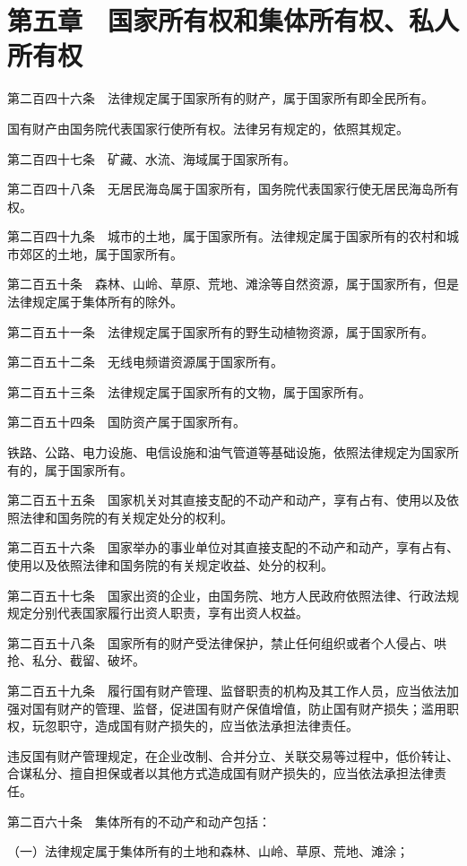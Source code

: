 \documentclass[UTF8,12pt,a4paper]{ctexbook}
\begin{document}
\section*{第五章　国家所有权和集体所有权、私人所有权}

第二百四十六条　法律规定属于国家所有的财产，属于国家所有即全民所有。

国有财产由国务院代表国家行使所有权。法律另有规定的，依照其规定。

第二百四十七条　矿藏、水流、海域属于国家所有。

第二百四十八条　无居民海岛属于国家所有，国务院代表国家行使无居民海岛所有权。

第二百四十九条　城市的土地，属于国家所有。法律规定属于国家所有的农村和城市郊区的土地，属于国家所有。

第二百五十条　森林、山岭、草原、荒地、滩涂等自然资源，属于国家所有，但是法律规定属于集体所有的除外。

第二百五十一条　法律规定属于国家所有的野生动植物资源，属于国家所有。

第二百五十二条　无线电频谱资源属于国家所有。

第二百五十三条　法律规定属于国家所有的文物，属于国家所有。

第二百五十四条　国防资产属于国家所有。

铁路、公路、电力设施、电信设施和油气管道等基础设施，依照法律规定为国家所有的，属于国家所有。

第二百五十五条　国家机关对其直接支配的不动产和动产，享有占有、使用以及依照法律和国务院的有关规定处分的权利。

第二百五十六条　国家举办的事业单位对其直接支配的不动产和动产，享有占有、使用以及依照法律和国务院的有关规定收益、处分的权利。

第二百五十七条　国家出资的企业，由国务院、地方人民政府依照法律、行政法规规定分别代表国家履行出资人职责，享有出资人权益。

第二百五十八条　国家所有的财产受法律保护，禁止任何组织或者个人侵占、哄抢、私分、截留、破坏。

第二百五十九条　履行国有财产管理、监督职责的机构及其工作人员，应当依法加强对国有财产的管理、监督，促进国有财产保值增值，防止国有财产损失；滥用职权，玩忽职守，造成国有财产损失的，应当依法承担法律责任。

违反国有财产管理规定，在企业改制、合并分立、关联交易等过程中，低价转让、合谋私分、擅自担保或者以其他方式造成国有财产损失的，应当依法承担法律责任。

第二百六十条　集体所有的不动产和动产包括：

（一）法律规定属于集体所有的土地和森林、山岭、草原、荒地、滩涂；
\end{document}
